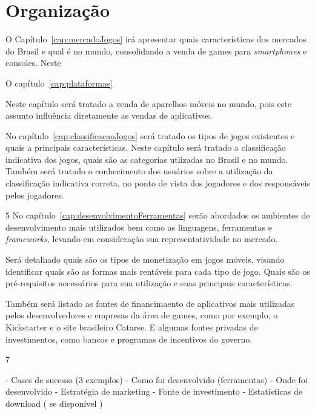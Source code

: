 
\section{Organização}


O Capítulo~\ref{cap:mercadoJogos} irá apresentar quais características dos mercados do Brasil e qual é no mundo, consolidando a venda de games para \emph{smartphones} e consoles. Neste 


O capítulo~\ref{cap:plataformas} 

Neste capítulo será tratado a venda de aparelhos móveis no mundo, pois este assunto influência diretamente as vendas de aplicativos.






No capítulo~\ref{cap:classificacaoJogos} será tratado os tipos de jogos existentes e quais a principais características.
Neste capítulo será tratado a classificação indicativa dos jogos, quais são as categorias utlizadas no Brasil e no mundo. Também será tratado o conhecimento dos usuários sobre a utilização da classificação indicativa correta, no ponto de vista dos jogadores e dos responsáveis pelos jogadores.



5
No capítulo~\ref{cap:desenvolvimentoFerramentas} serão abordados os ambientes de desenvolvimento mais utilizados bem como as linguagens, ferramentas e \emph{frameworks}, levando em consideração sua representatividade no mercado.

Será detalhado quais são os tipos de monetização em jogos móveis, visando identificar quais são as formas mais rentáveis para cada tipo de jogo. Quais são os pré-requisitos necessários para sua utilização e suas principais características.

Também será listado as fontes de financimaento de aplicativos mais utilizadas pelos desenvolvedores e empresas da área de games, como por exemplo, o Kickstarter\cite{kickstarter} e o site brasileiro Catarse\cite{catarse}. E algumas fontes privadas de investimentos, como bancos e programas de incentivos do governo.





7 

- Cases de sucesso (3 exemplos)
	- Como foi desenvolvido (ferramentas)
	- Onde foi desenvolvido
	- Estratégia de marketing
	- Fonte de investimento
	- Estatísticas de download ( se disponível )
	

